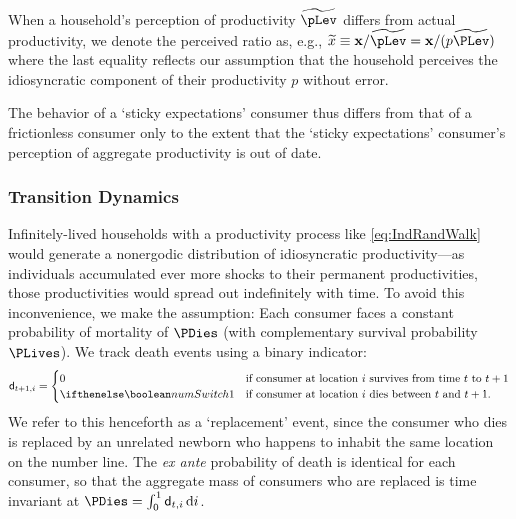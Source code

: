 \documentclass[titlepage]{\econtex}\newcommand{\texname}{cAndCwithStickyE}
\begin{document}
When a household's perception of productivity $\perc{\pLev}$ differs from actual productivity, we denote the perceived ratio as, e.g., $\perc{x} \equiv \mathbf{x}/\perc{\pLev} = \mathbf{x}/({p}\perc{\PLev})$ where the last equality reflects our assumption that the household perceives the idiosyncratic component of their productivity ${p}$ without error.

The behavior of a `sticky expectations' consumer thus differs from that of a frictionless consumer only to the extent that the `sticky expectations' consumer's perception of aggregate productivity is out of date.

\subsubsection{Transition Dynamics}

Infinitely-lived households with a productivity process like \eqref{eq:IndRandWalk} would generate a nonergodic distribution of idiosyncratic productivity---as individuals accumulated ever more shocks to their permanent productivities, those productivities would spread out indefinitely with time. To avoid this inconvenience, we make the \cite{blanchardFinite} assumption: Each consumer faces a constant probability of mortality of $\PDies$ (with complementary survival probability $\PLives$). %
We track death events using a binary indicator:
\begin{equation*}
\pDies_{t+1,i} =
  \begin{cases}
    0 & \text{if consumer at location $i$ survives from time $t$ to $t+1$}
\\ \ifnumSw  1 & \text{if consumer at location $i$ dies between $t$ and $t+1$}.
  \end{cases}
\end{equation*}
We refer to this henceforth as a `replacement' event, since the consumer who dies is replaced by an unrelated newborn who happens to inhabit the same location on the number line.  The {\it ex ante} probability of death is identical for each consumer, so that the aggregate mass of consumers who are replaced is time invariant at $\PDies = \int_{0}^{1} \pDies_{t,i}\,\text{d}i$.
\end{document}
